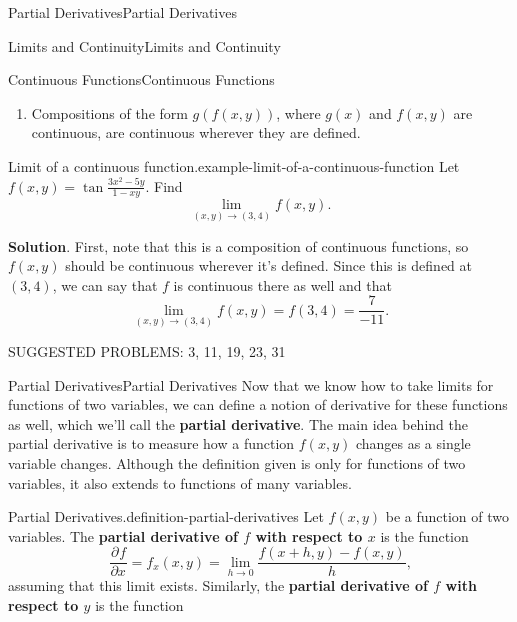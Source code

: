 \documentclass[10pt,]{book}
\newcommand{\terminology}[1]{\textbf{#1}}
\numberwithin{equation}{section}
\newcommand{\pdv}[3][]{\dfrac{\partial^{#1} #2}{\partial #3^{#1}}}
\begin{document}
\begin{chapterptx}{Partial Derivatives}{}{Partial Derivatives}{}{}
\begin{sectionptx}{Limits and Continuity}{}{Limits and Continuity}{}{}
\begin{subsectionptx}{Continuous Functions}{}{Continuous Functions}{}{}
\begin{enumerate}
\item\hypertarget{li-94}{}Compositions of the form \(g(f(x,y))\), where \(g(x)\) and \(f(x,y)\) are continuous, are continuous wherever they are defined.%
\end{enumerate}
\begin{example}{Limit of a continuous function.}{example-limit-of-a-continuous-function}%
\hypertarget{p-1134}{}%
Let \(f(x,y) = \tan\frac{3x^{2}-5y}{1-xy}\). Find%
\begin{equation*}
\lim_{(x,y)\to(3,4)}f(x,y).
\end{equation*}
%
\par\smallskip%
\noindent\textbf{Solution}.\hypertarget{solution-174}{}\quad%
\hypertarget{p-1135}{}%
First, note that this is a composition of continuous functions, so \(f(x,y)\) should be continuous wherever it's defined. Since this is defined at \((3,4)\), we can say that \(f\) is continuous there as well and that%
\begin{equation*}
\lim_{(x,y)\to(3,4)}f(x,y) = f(3,4) = \frac{7}{-11}.
\end{equation*}
%
\end{example}
\end{subsectionptx}
\hypertarget{p-1136}{}%
SUGGESTED PROBLEMS: 3, 11, 19, 23, 31%
\end{sectionptx}
%
%
\typeout{************************************************}
\typeout{************************************************}
%
\begin{sectionptx}{Partial Derivatives}{}{Partial Derivatives}{}{}\label{section-partial-derivatives}
Now that we know how to take limits for functions of two variables, we can define a notion of derivative for these functions as well, which we'll call the \terminology{partial derivative}. The main idea behind the partial derivative is to measure how a function \(f(x,y)\) changes as a single variable changes. Although the definition given is only for functions of two variables, it also extends to functions of many variables.\begin{definition}{Partial Derivatives.}{definition-partial-derivatives}%
\hypertarget{p-1137}{}%
Let \(f(x,y)\) be a function of two variables. The \terminology{partial derivative of \(f\) with respect to \(x\)} is the function%
\begin{equation*}
\pdv{f}{x} = f_{x}(x,y) = \lim_{h\to0}\frac{f(x+h,y)-f(x,y)}{h}\text{,}
\end{equation*}
assuming that this limit exists. Similarly, the \terminology{partial derivative of \(f\) with respect to \(y\)} is the function%

\end{definition}
\end{sectionptx}
\end{chapterptx}
\end{document}
